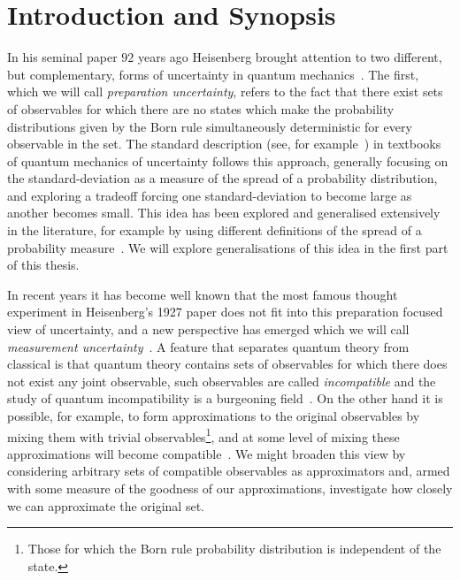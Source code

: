 
\let\textcircled=\pgftextcircled
\chapter{Introduction and Synopsis}
\label{chap:intro}

In his seminal paper $92$ years ago Heisenberg brought attention to two different, but complementary, forms of uncertainty in quantum mechanics~\cite{Heisenberg1927-Wheeler+Zurek}. The first, which we will call \emph{preparation uncertainty}, refers to the fact that there exist sets of observables for which there are no states which make the probability distributions given by the Born rule simultaneously deterministic for every observable in the set. The standard description (see, for example~\cite{griffiths2005introduction}) in textbooks of quantum mechanics of uncertainty follows this approach, generally focusing on the standard-deviation as a measure of the spread of a probability distribution, and exploring a tradeoff forcing one standard-deviation to become large as another becomes small. This idea has been explored and generalised extensively in the literature, for example by using different definitions of the spread of a probability measure~\cites{MaassenUffink1988}{doi:10.1063/1.3614503}{doi:10.1063/1.2759831}. We will explore generalisations of this idea in the first part of this thesis.

In recent years it has become well known that the most famous thought experiment in Heisenberg's 1927 paper does not fit into this preparation focused view of uncertainty, and a new perspective has emerged which we will call \emph{measurement uncertainty}~\cites{PhysRevLett.111.160405}{blw-meas-uncertainty}{6773660Werner:2004:URJ:2011593.2011606}. A feature that separates quantum theory from classical is that quantum theory contains sets of observables for which there does not exist any joint observable, such observables are called \emph{incompatible} and the study of quantum incompatibility is a burgeoning field~\cites{Heinosaari_2016}{PhysRevLett.122.130402}{Heinosaari_2017}{PhysRevA.96.052127}. On the other hand it is possible, for example, to form approximations to the original observables by mixing them with trivial observables\footnote{Those for which the Born rule probability distribution is independent of the state.}, and at some level of mixing these approximations will become compatible~\cite{PhysRevA.87.052125}. We might broaden this view by considering arbitrary sets of compatible observables as approximators and, armed with some measure of the goodness of our approximations, investigate how closely we can approximate the original set.


